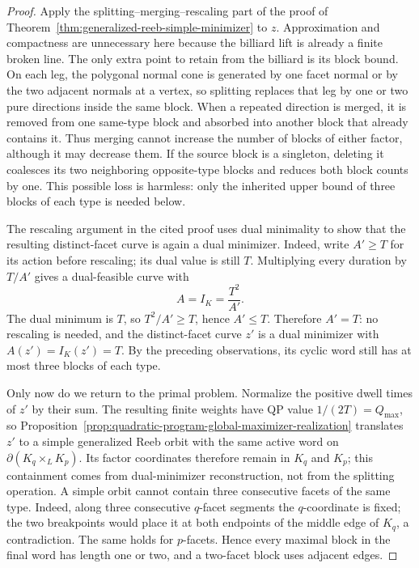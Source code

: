 \begin{proof}
Apply the splitting--merging--rescaling part of the proof of
Theorem~\ref{thm:generalized-reeb-simple-minimizer} to \(z\). Approximation and
compactness are unnecessary here because the billiard lift is already a finite
broken line. The only extra point to retain from the billiard is its block
bound. On each leg, the polygonal normal cone is generated by one facet normal
or by the two adjacent normals at a vertex, so splitting replaces that leg by
one or two pure directions inside the same block. When a repeated direction is
merged, it is removed from one same-type block and absorbed into another block
that already contains it.  Thus merging cannot increase the number of blocks
of either factor, although it may decrease them.  If the source block is a
singleton, deleting it coalesces its two neighboring opposite-type blocks and
reduces both block counts by one.  This possible loss is harmless: only the
inherited upper bound of three blocks of each type is needed below.

The rescaling argument in the cited proof uses dual minimality to show that the
resulting distinct-facet curve is again a dual minimizer. Indeed, write
\(A'\geq T\) for its action before rescaling; its dual value is still \(T\).
Multiplying every duration by \(T/A'\) gives a dual-feasible curve with
\[
  A=I_K=\frac{T^2}{A'}.
\]
The dual minimum is \(T\), so \(T^2/A'\geq T\), hence \(A'\leq T\). Therefore
\(A'=T\): no rescaling is needed, and the distinct-facet curve \(z'\) is a
dual minimizer with \(A(z')=I_K(z')=T\). By the preceding observations, its
cyclic word still has at most three blocks of each type.

Only now do we return to the primal problem.  Normalize the positive dwell
times of \(z'\) by their sum. The resulting finite weights have QP value
\(1/(2T)=Q_{\max}\), so
Proposition~\ref{prop:quadratic-program-global-maximizer-realization} translates
\(z'\) to a simple generalized Reeb orbit with the same active word on
\(\partial(K_q\times_L K_p)\).  Its factor coordinates therefore remain in
\(K_q\) and \(K_p\); this containment comes from dual-minimizer reconstruction,
not from the splitting operation. A simple orbit cannot contain three
consecutive facets of the same type. Indeed, along
three consecutive \(q\)-facet segments the \(q\)-coordinate is fixed; the two
breakpoints would place it at both endpoints of the middle edge of \(K_q\), a
contradiction. The same holds for \(p\)-facets. Hence every maximal block in
the final word has length one or two, and a two-facet block uses adjacent
edges.


\end{proof}
